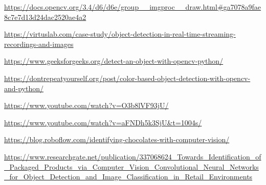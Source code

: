 \documentclass{article}
\begin{document}
\begin{thebibliography}{9}
\url{https://docs.opencv.org/3.4/d6/d6e/group__imgproc__draw.html#ga7078a9fae8c7e7d13d24dac2520ae4a2}

\url{https://virtuslab.com/case-study/object-detection-in-real-time-streaming-recordings-and-images}

\url{https://www.geeksforgeeks.org/detect-an-object-with-opencv-python/}

\url{https://dontrepeatyourself.org/post/color-based-object-detection-with-opencv-and-python/}

\url{https://www.youtube.com/watch?v=O3b8lVF93jU/}

\url{https://www.youtube.com/watch?v=aFNDh5k3SjU&t=1004s/}

\url{https://blog.roboflow.com/identifying-chocolates-with-computer-vision/}

 \url{https://www.researchgate.net/publication/337068624_Towards_Identification_of_Packaged_Products_via_Computer_Vision_Convolutional_Neural_Networks_for_Object_Detection_and_Image_Classification_in_Retail_Environments}

\end{thebibliography}
\end{document}
